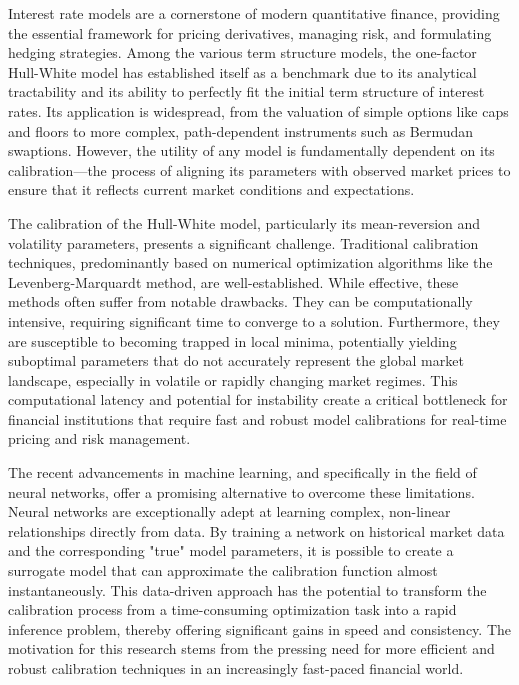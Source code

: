 Interest rate models are a cornerstone of modern quantitative finance, providing the essential framework for pricing derivatives, managing risk, and formulating hedging strategies. Among the various term structure models, the one-factor Hull-White model has established itself as a benchmark due to its analytical tractability and its ability to perfectly fit the initial term structure of interest rates. Its application is widespread, from the valuation of simple options like caps and floors to more complex, path-dependent instruments such as Bermudan swaptions. However, the utility of any model is fundamentally dependent on its calibration---the process of aligning its parameters with observed market prices to ensure that it reflects current market conditions and expectations.

The calibration of the Hull-White model, particularly its mean-reversion and volatility parameters, presents a significant challenge. Traditional calibration techniques, predominantly based on numerical optimization algorithms like the Levenberg-Marquardt method, are well-established. While effective, these methods often suffer from notable drawbacks. They can be computationally intensive, requiring significant time to converge to a solution. Furthermore, they are susceptible to becoming trapped in local minima, potentially yielding suboptimal parameters that do not accurately represent the global market landscape, especially in volatile or rapidly changing market regimes. This computational latency and potential for instability create a critical bottleneck for financial institutions that require fast and robust model calibrations for real-time pricing and risk management.

The recent advancements in machine learning, and specifically in the field of neural networks, offer a promising alternative to overcome these limitations. Neural networks are exceptionally adept at learning complex, non-linear relationships directly from data. By training a network on historical market data and the corresponding "true" model parameters, it is possible to create a surrogate model that can approximate the calibration function almost instantaneously. This data-driven approach has the potential to transform the calibration process from a time-consuming optimization task into a rapid inference problem, thereby offering significant gains in speed and consistency. The motivation for this research stems from the pressing need for more efficient and robust calibration techniques in an increasingly fast-paced financial world.

